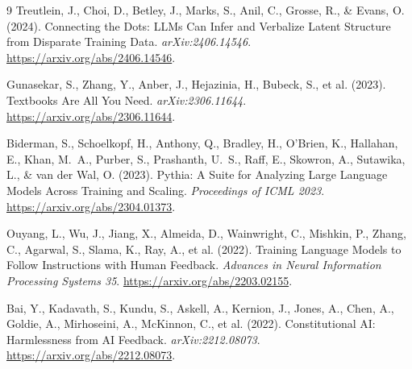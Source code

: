 \documentclass[11pt]{article}
\begin{document}
\begin{thebibliography}{9}
Treutlein, J., Choi, D., Betley, J., Marks, S., Anil, C., Grosse, R., \& Evans, O. (2024).
Connecting the Dots: LLMs Can Infer and Verbalize Latent Structure from Disparate Training Data.
\textit{arXiv:2406.14546}. \url{https://arxiv.org/abs/2406.14546}.

Gunasekar, S., Zhang, Y., Anber, J., Hejazinia, H., Bubeck, S., et al. (2023).
Textbooks Are All You Need.
\textit{arXiv:2306.11644}. \url{https://arxiv.org/abs/2306.11644}.

Biderman, S., Schoelkopf, H., Anthony, Q., Bradley, H., O'Brien, K., Hallahan, E., Khan, M.~A., Purber, S., Prashanth, U.~S., Raff, E., Skowron, A., Sutawika, L., \& van der Wal, O. (2023).
Pythia: A Suite for Analyzing Large Language Models Across Training and Scaling.
\textit{Proceedings of ICML 2023}. \url{https://arxiv.org/abs/2304.01373}.

Ouyang, L., Wu, J., Jiang, X., Almeida, D., Wainwright, C., Mishkin, P., Zhang, C., Agarwal, S., Slama, K., Ray, A., et al. (2022).
Training Language Models to Follow Instructions with Human Feedback.
\textit{Advances in Neural Information Processing Systems 35}. \url{https://arxiv.org/abs/2203.02155}.

Bai, Y., Kadavath, S., Kundu, S., Askell, A., Kernion, J., Jones, A., Chen, A., Goldie, A., Mirhoseini, A., McKinnon, C., et al. (2022).
Constitutional AI: Harmlessness from AI Feedback.
\textit{arXiv:2212.08073}. \url{https://arxiv.org/abs/2212.08073}.

\end{thebibliography}
\end{document}
